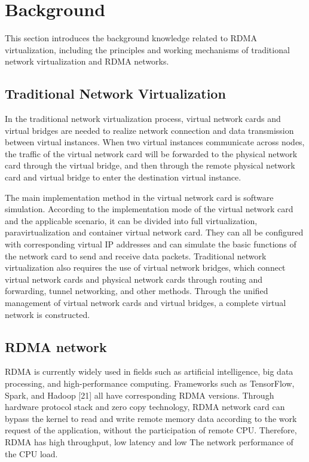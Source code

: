 \documentclass[sigplan,screen]{acmart}
\begin{document}
\section{Background}
This section introduces the background knowledge related to RDMA virtualization, including the principles and working mechanisms of traditional network virtualization and RDMA networks.
	
\subsection{Traditional Network Virtualization}

In the traditional network virtualization process, virtual network cards and virtual bridges are needed to realize network connection and data transmission between virtual instances. When two virtual instances communicate across nodes, the traffic of the virtual network card will be forwarded to the physical network card through the virtual bridge, and then through the remote physical network card and virtual bridge to enter the destination virtual instance.

The main implementation method in the virtual network card is software simulation. According to the implementation mode of the virtual network card and the applicable scenario, it can be divided into full virtualization, paravirtualization and container virtual network card. They can all be configured with corresponding virtual IP addresses and can simulate the basic functions of the network card to send and receive data packets. Traditional network virtualization also requires the use of virtual network bridges, which connect virtual network cards and physical network cards through routing and forwarding, tunnel networking, and other methods. Through the unified management of virtual network cards and virtual bridges, a complete virtual network is constructed.

\subsection{RDMA network}
RDMA is currently widely used in fields such as artificial intelligence, big data processing, and high-performance computing. Frameworks such as TensorFlow, Spark, and Hadoop [21] all have corresponding RDMA versions. Through hardware protocol stack and zero copy technology, RDMA network card can bypass the kernel to read and write remote memory data according to the work request of the application, without the participation of remote CPU. Therefore, RDMA has high throughput, low latency and low The network performance of the CPU load.
\end{document}
